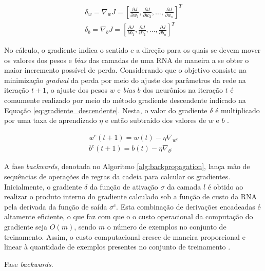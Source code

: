 \begin{gather}\label{eq:gradiente}
	\delta_w = \nabla_{w} J = \left[
							\frac{\partial J}{\partial w_1}, \frac{\partial J}{\partial w_2}, \ldots, \frac{\partial J}{\partial w_n}
						\right]^T\\
	\delta_b = \nabla_{b} J = \left[
							\frac{\partial J}{\partial b_1}, \frac{\partial J}{\partial b_2}, \ldots, \frac{\partial J}{\partial b_n}
						\right]^T
\end{gather}

No cálculo, o gradiente indica o sentido e a direção para os quais se devem mover os valores dos pesos e \emph{bias} das camadas de uma RNA de maneira a se obter o maior incremento possível de perda. Considerando que o objetivo consiste na minimização \emph{gradual} da perda por meio do ajuste dos parâmetros da rede na iteração $t+1$, o ajuste dos pesos $w$ e \emph{bias} $b$ dos neurônios na iteração $t$ é comumente realizado por meio do método gradiente descendente indicado na Equação \ref{eq:gradiente_descendente}. Nesta, o valor do gradiente $\delta$ é multiplicado por uma taxa de aprendizado $\eta$ e então subtraído dos valores de $w$ e $b$ \cite{haykin2009neural, goodfellow2016deep}.

\begin{gather}\label{eq:gradiente_descendente}
	w^c(t+1) = w(t) - \eta \nabla_{w^c} \\
	b^c(t+1) = b(t) - \eta \nabla_{b^c}
\end{gather}

A fase \emph{backwards}, denotada no Algoritmo \ref{alg:backpropagation}, lança mão de sequências de operações de regras da cadeia para calcular os gradientes. Inicialmente, o gradiente $\delta$ da função de ativação $\sigma$ da camada $l$ é obtido ao realizar o produto interno do gradiente calculado sob a função de custo da RNA pela derivada da função de saída $\sigma^c$. Esta combinação de derivações encadeadas é altamente eficiente, o que faz com que o o custo operacional da computação do gradiente seja $O(m)$, sendo $m$ o número de exemplos no conjunto de treinamento. Assim, o custo computacional cresce de maneira proporcional e linear à quantidade de exemplos presentes no conjunto de treinamento \cite{haykin2009neural, goodfellow2016deep}.

\begin{algorithm}
	\caption{Fase \emph{backwards}.}\label{alg:backpropagation}
\end{algorithm}

